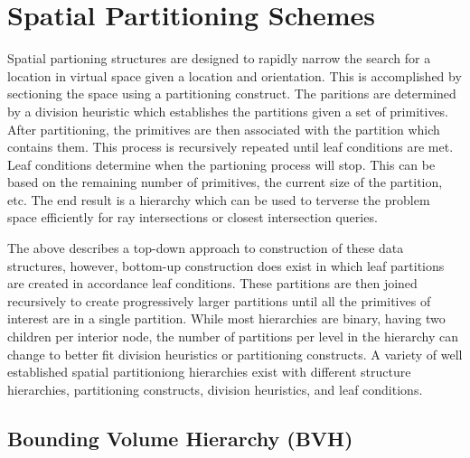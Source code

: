 \documentclass[10pt, a4paper]{article}
\begin{document}
\section{Spatial Partitioning Schemes}%

Spatial partioning structures are designed to rapidly narrow the search for a location in virtual space given a location and orientation. This is accomplished by sectioning the space using a partitioning construct. The paritions are determined by a division heuristic which establishes the partitions given a set of primitives. After partitioning, the primitives are then associated with the partition which contains them. This process is recursively repeated until leaf conditions are met. Leaf conditions determine when the partioning process will stop. This can be based on the remaining number of primitives, the current size of the partition, etc. The end result is a hierarchy which can be used to terverse the problem space efficiently for ray intersections or closest intersection queries. 

The above describes a top-down approach to construction of these data structures, however, bottom-up construction does exist in which leaf partitions are created in accordance leaf conditions. These partitions are then joined recursively to create progressively larger partitions until all the primitives of interest are in a single partition. While most hierarchies are binary, having two children per interior node, the number of partitions per level in the hierarchy can change to better fit division heuristics or partitioning constructs. A variety of well established spatial partitioniong hierarchies exist with different structure hierarchies, partitioning constructs, division heuristics, and leaf conditions.

 
\subsection{Bounding Volume Hierarchy (BVH)}%
\end{document}
